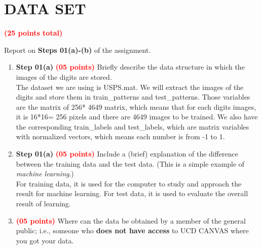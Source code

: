 \documentclass[dvipsnames,12pt]{article} %
\newcommand{\Brd}[1]{{\textbf{\textcolor{Red}{#1}}}}               %
\newcommand{\Brm}[1]{\textbf{\textcolor[rgb]{0.69,0.19,0.38}{#1}}} %
\begin{document}
  \section{DATA SET}
    \label{SECT 02:DATA}

      \Brd{(25 points total)}

      \vspace{06pt}

      Report on \textbf{Steps 01(a)-(b)} of the assignment.
        

      \begin{enumerate}[label=\textbf{(\alph*}), leftmargin=48pt]


        \vspace{06pt}

        \item \textbf{Step 01(a)}  \Brd{(05 points)} Briefly describe the data structure in which
          the images of the digits are stored.\\
          
        The dataset we are using is USPS.mat. We will extract the images of the digits and store them in train\_patterns and test\_patterns. Those variables are the matrix of 256* 4649 matrix, which means that for each digits images, it is 16*16= 256 pixels and there are 4649 images to be trained. We also have the corresponding train\_labels and test\_labels, which are matrix variables with normalized vectors, which means each number is from -1 to 1.
          
        
        \vspace{06pt}

        \item \textbf{Step 01(a)} \Brd{(05 points)} Include a (brief) explanation of the difference
          between the training data and the test data.
          (This is a simple example of \textit{machine learning}.)\\
        For training data, it is used for the computer to study and approach the result for machine learning. For test data, it is used to evaluate the overall result of learning. 
        \vspace{06pt}

        \item \Brd{(05 points)} Where can the data be obtained by a member of the general public;
          i.e., someone who \Brm{does not have access} to UCD CANVAS where you got your data.\\
          

\end{enumerate}
\end{document}
